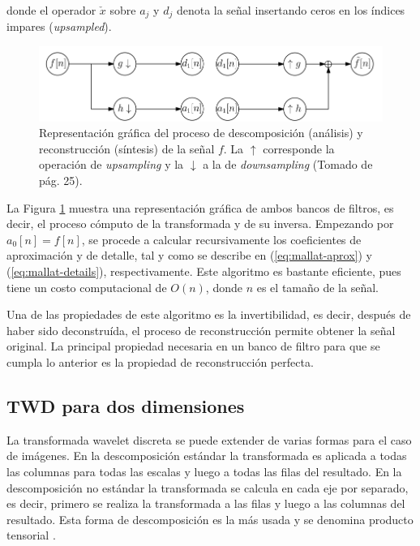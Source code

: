 \noindent donde el operador $\check x$ sobre $a_j$ y $d_j$ denota la señal insertando ceros en los índices impares
(\textit{upsampled}).

\begin{figure}\label{fig:dwt-filterbanks-1D}
	\includegraphics[scale=0.5]{Graphics/dwt-filterbanks-1D.png}
	\caption{Representación gráfica del proceso de descomposición (análisis) y reconstrucción (síntesis) de la señal $f$. La $\uparrow$ corresponde la operación de \textit{upsampling} y la $\downarrow$ a la de \textit{downsampling} (Tomado de \cite{Recoskie2018} pág. 25).}\label{fig:dwt-filterbanks-1D}
\end{figure}

La Figura \ref{fig:dwt-filterbanks-1D} muestra una representación gráfica de ambos bancos de filtros, es decir, 
el proceso cómputo de la transformada y de su inversa. Empezando por $a_0[n] = f[n]$, se procede a calcular recursivamente
los coeficientes de aproximación y de detalle, tal y como se describe en (\ref{eq:mallat-aprox}) y (\ref{eq:mallat-details}),
respectivamente. Este algoritmo es bastante eficiente, pues tiene un costo computacional de $O(n)$, donde $n$
es el tamaño de la señal. 

Una de las propiedades de este algoritmo es la invertibilidad, es decir, después de haber sido deconstruída, el proceso
de reconstrucción permite obtener la señal original. La principal propiedad necesaria en un banco de filtro 
para que se cumpla lo anterior es la propiedad de reconstrucción perfecta. 

\subsection{TWD para dos dimensiones}\label{section:dwt-2d}

La transformada wavelet discreta se puede extender de varias formas para el caso de imágenes.
En la descomposición estándar la transformada es aplicada a todas las columnas para todas las escalas
y luego a todas las filas del resultado. En la descomposición no estándar la transformada se calcula en cada
eje por separado, es decir, primero se realiza la transformada a las filas y luego a las columnas del resultado. 
Esta forma de descomposición es la más usada y se denomina producto tensorial \cite{WaveletVariants2D}.

